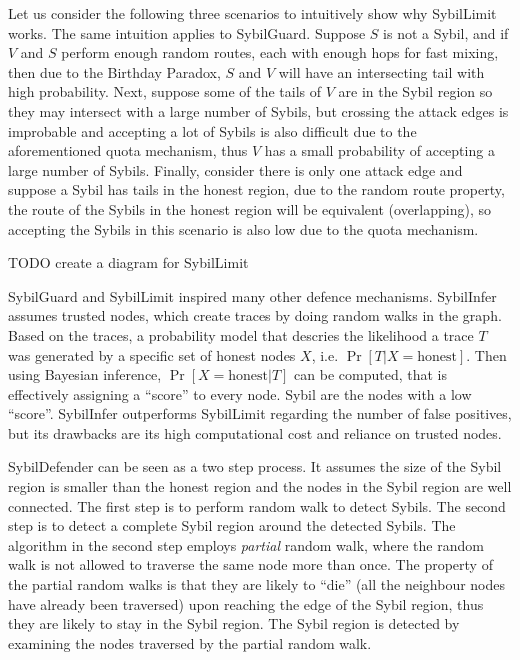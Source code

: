 Let us consider the following three scenarios to intuitively show why SybilLimit
works. The same intuition applies to SybilGuard. Suppose $S$ is not a Sybil, and
if $V$ and $S$ perform enough random routes, each with enough hops for fast
mixing, then due to the Birthday Paradox, $S$ and $V$ will have an intersecting
tail with high probability. Next, suppose some of the tails of $V$ are in the
Sybil region so they may intersect with a large number of Sybils, but crossing
the attack edges is improbable and accepting a lot of Sybils is also difficult
due to the aforementioned quota mechanism, thus $V$ has a small probability of
accepting a large number of Sybils. Finally, consider there is only one attack
edge and suppose a Sybil has tails in the honest region, due to the random route
property, the route of the Sybils in the honest region will be equivalent
(overlapping), so accepting the Sybils in this scenario is also low due to the
quota mechanism.

TODO create a diagram for SybilLimit

SybilGuard and SybilLimit inspired many other defence mechanisms.
SybilInfer\cite{danezis2009sybilinfer} assumes trusted nodes, which create
traces by doing random walks in the graph. Based on the traces, a probability
model that descries the likelihood a trace $T$ was generated by a specific set
of honest nodes $X$, i.e. $\Pr[ T | X = \text{honest}]$. Then using Bayesian
inference, $\Pr[ X = \text{honest}| T ]$ can be computed, that is effectively
assigning a ``score'' to every node. Sybil are the nodes with a low ``score''.
SybilInfer outperforms SybilLimit regarding the number of false positives, but
its drawbacks are its high computational cost and reliance on trusted nodes.

SybilDefender\cite{wei2012sybildefender} can be seen as a two step process. It
assumes the size of the Sybil region is smaller than the honest region and the
nodes in the Sybil region are well connected. The first step is to perform
random walk to detect Sybils. The second step is to detect a complete Sybil
region around the detected Sybils. The algorithm in the second step employs
\emph{partial} random walk, where the random walk is not allowed to traverse the
same node more than once. The property of the partial random walks is that they
are likely to ``die'' (all the neighbour nodes have already been traversed) upon
reaching the edge of the Sybil region, thus they are likely to stay in the Sybil
region. The Sybil region is detected by examining the nodes traversed by the
partial random walk.

